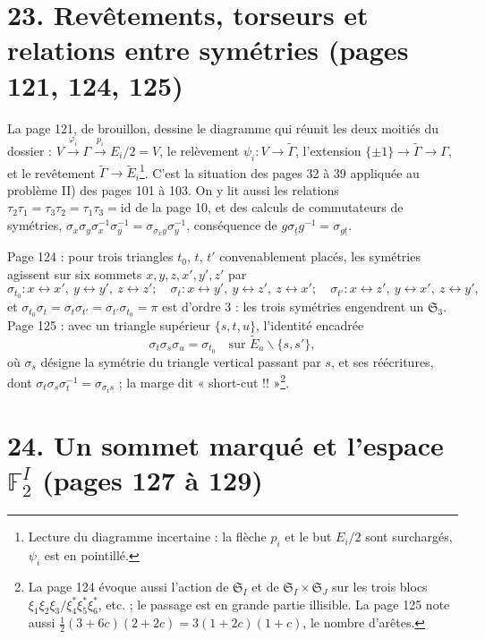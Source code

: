 \documentclass[11pt,a4paper]{article}
\begin{document}
\section*{23. Revêtements, torseurs et relations entre symétries (pages 121, 124, 125)}

La page 121, de brouillon, dessine le diagramme qui réunit les deux moitiés du
dossier : $V \xrightarrow{\varphi_i} \Gamma \xrightarrow{p_i} E_i/2 = V$, le relèvement
$\psi_i : V \to \widetilde\Gamma$, l'extension $\lbrace \pm 1\rbrace \to
\widetilde\Gamma \to \Gamma$, et le revêtement $\widetilde\Gamma \to \widetilde
E_i$\footnote{Lecture du diagramme incertaine : la flèche $p_i$ et le but $E_i/2$
sont surchargés, $\psi_i$ est en pointillé.}. C'est la situation des pages 32 à
39 appliquée au problème II) des pages 101 à 103. On y lit aussi les relations
$\tau_2\tau_1 = \tau_3\tau_2 = \tau_1\tau_3 = \mathrm{id}$ de la page 10, et des
calculs de commutateurs de symétries, $\sigma_x \sigma_y \sigma_x^{-1}\sigma_y^{-1}
= \sigma_{\sigma_x y}\sigma_y^{-1}$, conséquence de $g\sigma_{\underline t}g^{-1}
= \sigma_{g \underline t}$.

Page 124 : pour trois triangles $t_0$, $t$, $t'$ convenablement placés, les
symétries agissent sur six sommets $x, y, z, x', y', z'$ par
\[
\sigma_{t_0} : x \leftrightarrow x', \ y \leftrightarrow y', \ z \leftrightarrow
z' ; \quad \sigma_t : x \leftrightarrow y', \ y \leftrightarrow z', \ z
\leftrightarrow x' ; \quad \sigma_{t'} : x \leftrightarrow z', \ y
\leftrightarrow x', \ z \leftrightarrow y' ,
\]
et $\sigma_{t_0}\sigma_t = \sigma_t\sigma_{t'} = \sigma_{t'}\sigma_{t_0} = \pi$ est
d'ordre 3 : les trois symétries engendrent un $\mathfrak{S}_3$. Page 125 : avec
un triangle supérieur $\lbrace s, t, u\rbrace$, l'identité encadrée
\[
\sigma_t \sigma_s \sigma_u = \sigma_{t_0} \quad \text{sur } \widetilde E_a
\smallsetminus \lbrace s, s'\rbrace ,
\]
où $\sigma_s$ désigne la symétrie du triangle vertical passant par $s$, et ses
réécritures, dont $\sigma_t \sigma_s \sigma_t^{-1} = \sigma_{\sigma_t s}$ ; la marge
dit « short-cut !! »\footnote{La page 124 évoque aussi l'action de
$\mathfrak{S}_I$ et de $\mathfrak{S}_I \times \mathfrak{S}_J$ sur les trois blocs
$\xi_1\xi_2\xi_3 / \xi^*_4\xi^*_5\xi^*_6$, etc. ; le passage est en grande partie
illisible. La page 125 note aussi $\frac12(3+6c)(2+2c) = 3(1+2c)(1+c)$, le nombre
d'arêtes.}.

\section*{24. Un sommet marqué et l'espace $\mathbb{F}_2^I$ (pages 127 à 129)}
\end{document}
